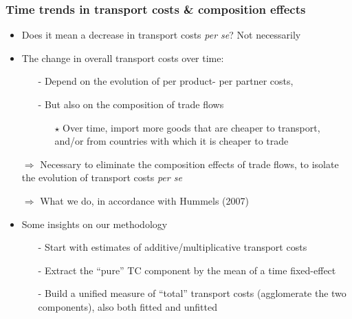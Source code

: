 \documentclass[10 pt,Helvetica, french]{beamer}
\begin{document}
\begin{frame} [label = slide_compeffects_strategy]
\frametitle{Time trends in transport costs \& composition effects }
\begin{itemize}
\item Does it mean a decrease in transport costs \textit{per se}? Not necessarily \vspace{0.2cm}
\item The change in overall transport costs over time: \vspace{0.1cm}
\begin{itemize}
\item[-] Depend on the evolution of per product- per partner costs, \vspace{0.1cm}
\item[-] But also on the composition of trade flows \vspace{0.1cm}
\begin{itemize}
\item[$\star$] Over time, import more goods that are cheaper to transport, and/or from countries with which it is cheaper to trade \vspace{0.1cm}
\end{itemize}
\end{itemize}
\item[$\Rightarrow$] Necessary to eliminate the composition effects of trade flows, to isolate the evolution of transport costs \textit{per se}   \vspace{0.1cm}
\item[$\Rightarrow$] What we do, in accordance with Hummels (2007) \vspace{0.1cm}
\item Some insights on our methodology \hyperlink{app_compeffects_strategy}{} \hyperlink{app_compeffects_Hummels}{} \vspace{0.1cm}
\begin{itemize}
\item[-] Start with estimates of additive/multiplicative transport costs  \vspace{0.1cm}
\item[-] Extract the ``pure'' TC component by the mean of a time fixed-effect \vspace{0.1cm}
\item[-] Build a unified measure of ``total'' transport costs (agglomerate the two components), also both fitted and unfitted
\end{itemize}
\end{itemize}
\end{frame}
\end{document}
